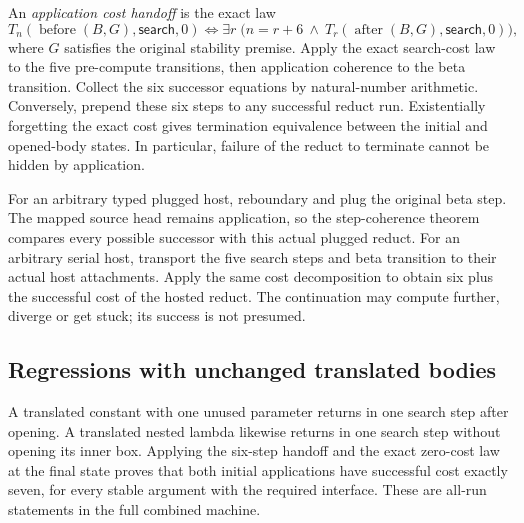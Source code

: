 An \emph{application cost handoff} is the exact law
\[
T_n(\operatorname{before}(B,G),\mathsf{search},0)
\iff \exists r\;\bigl(n=r+6\ \land\
T_r(\operatorname{after}(B,G),\mathsf{search},0)\bigr),
\]
where $G$ satisfies the original stability premise. Apply the exact search-cost
law to the five pre-compute transitions, then application coherence to the
beta transition. Collect the six successor equations by natural-number
arithmetic. Conversely, prepend these six steps to any successful reduct run.
Existentially forgetting the exact cost gives termination equivalence between
the initial and opened-body states. In particular, failure of the reduct to
terminate cannot be hidden by application.



For an arbitrary typed plugged host, reboundary and plug the original beta
step. The mapped source head remains application, so the step-coherence theorem
compares every possible successor with this actual plugged reduct. For an
arbitrary serial host, transport the five search steps and beta transition to
their actual host attachments. Apply the same cost decomposition to obtain
six plus the successful cost of the hosted reduct. The continuation may
compute further, diverge or get stuck; its success is not presumed.



\subsection{Regressions with unchanged translated bodies}

A translated constant with one unused parameter returns in one search step
after opening. A translated nested lambda likewise returns in one search step
without opening its inner box. Applying the six-step handoff and the exact
zero-cost law at the final state proves that both initial applications have
successful cost exactly seven, for every stable argument with the required
interface. These are all-run statements in the full combined machine.


